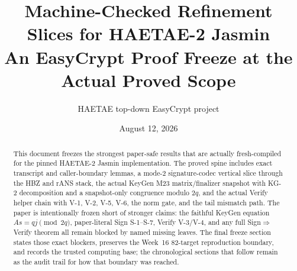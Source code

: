 \documentclass[11pt,a4paper]{article}
\title{Machine-Checked Refinement Slices for HAETAE-2 Jasmin\\
An EasyCrypt Proof Freeze at the Actual Proved Scope}
\author{HAETAE top-down EasyCrypt project}
\date{August 12, 2026}
\begin{document}
\maketitle

\begin{abstract}
This document freezes the strongest paper-safe results that are actually
fresh-compiled for the pinned HAETAE-2 Jasmin implementation.  The proved
spine includes exact transcript and caller-boundary lemmas, a mode-2
signature-codec vertical slice through the HBZ and rANS stack, the actual
KeyGen M23 matrix/finalizer snapshot with KG-2 decomposition and a
snapshot-only congruence modulo \(2q\), and the actual Verify helper chain
with V-1, V-2, V-5, V-6, the norm gate, and the tail mismatch path.  The
paper is intentionally frozen short of stronger claims: the faithful KeyGen
equation \(A s = q j \pmod{2q}\), paper-literal Sign S-1--S-7, Verify V-3/V-4,
and any full Sign\(\Rightarrow\)Verify theorem all remain blocked by named
missing leaves.  The final freeze section states those exact blockers,
preserves the Week~16 82-target reproduction boundary, and records the trusted
computing base; the chronological sections that follow remain as the audit
trail for how that boundary was reached.
\end{abstract}

\tableofcontents









































\end{document}
